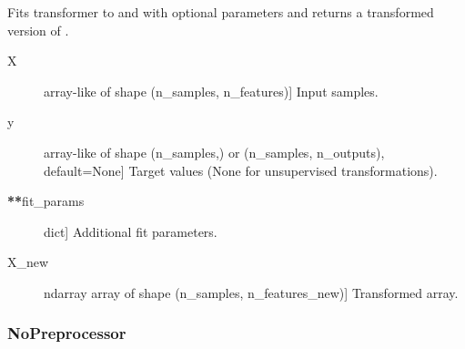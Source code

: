 \documentclass[letterpaper,10pt,english]{sphinxmanual}
\begin{document}
\begin{fulllineitems}
\begin{fulllineitems}
Fits transformer to  and  with optional parameters 
and returns a transformed version of .
\begin{description}
\item[{X}] \leavevmode{[}array-like of shape (n\_samples, n\_features){]}
Input samples.

\item[{y}] \leavevmode{[}array-like of shape (n\_samples,) or (n\_samples, n\_outputs),                 default=None{]}
Target values (None for unsupervised transformations).

\item[{{\color{red}\bfseries{}**}fit\_params}] \leavevmode{[}dict{]}
Additional fit parameters.

\end{description}
\begin{description}
\item[{X\_new}] \leavevmode{[}ndarray array of shape (n\_samples, n\_features\_new){]}
Transformed array.

\end{description}

\end{fulllineitems}


\end{fulllineitems}



\subsubsection{NoPreprocessor}
\label{\detokenize{api/mastml.preprocessing.NoPreprocessor:nopreprocessor}}\label{\detokenize{api/mastml.preprocessing.NoPreprocessor::doc}}
\end{document}
